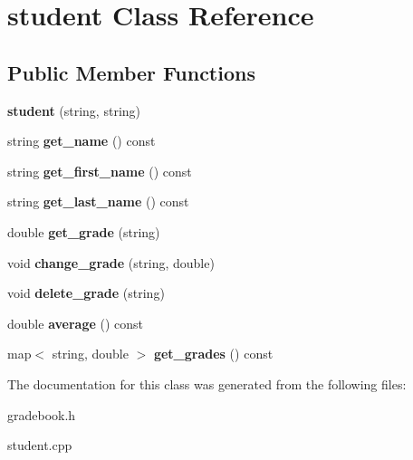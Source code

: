 \hypertarget{classstudent}{}\section{student Class Reference}
\label{classstudent}
\subsection*{Public Member Functions}
\begin{DoxyCompactItemize}
\item 
{\bfseries student} (string, string)\hypertarget{classstudent_ab0157490a34b0bfb685832aa8ac39dfa}{}\label{classstudent_ab0157490a34b0bfb685832aa8ac39dfa}

\item 
string {\bfseries get\+\_\+name} () const \hypertarget{classstudent_a5cdb29c7ac585a1b6f3862d91e4a0373}{}\label{classstudent_a5cdb29c7ac585a1b6f3862d91e4a0373}

\item 
string {\bfseries get\+\_\+first\+\_\+name} () const \hypertarget{classstudent_afc058a05fd8b16d9804d47310c7e7c62}{}\label{classstudent_afc058a05fd8b16d9804d47310c7e7c62}

\item 
string {\bfseries get\+\_\+last\+\_\+name} () const \hypertarget{classstudent_a87aa0cf551b65ed14caf3c7eb2f44387}{}\label{classstudent_a87aa0cf551b65ed14caf3c7eb2f44387}

\item 
double {\bfseries get\+\_\+grade} (string)\hypertarget{classstudent_a1fefbeb70855037595715384b514fb09}{}\label{classstudent_a1fefbeb70855037595715384b514fb09}

\item 
void {\bfseries change\+\_\+grade} (string, double)\hypertarget{classstudent_a73e4be236ee57b5d0369ef80b11a79c3}{}\label{classstudent_a73e4be236ee57b5d0369ef80b11a79c3}

\item 
void {\bfseries delete\+\_\+grade} (string)\hypertarget{classstudent_a2b9c29486ce447ddf8e63b73dd6bfb67}{}\label{classstudent_a2b9c29486ce447ddf8e63b73dd6bfb67}

\item 
double {\bfseries average} () const \hypertarget{classstudent_a04d4264e30fe5581cef0b1c4bc7ee7fc}{}\label{classstudent_a04d4264e30fe5581cef0b1c4bc7ee7fc}

\item 
map$<$ string, double $>$ {\bfseries get\+\_\+grades} () const \hypertarget{classstudent_a04c517e03fc3bd3eee2aedcff1d24e2a}{}\label{classstudent_a04c517e03fc3bd3eee2aedcff1d24e2a}

\end{DoxyCompactItemize}


The documentation for this class was generated from the following files\+:\begin{DoxyCompactItemize}
\item 
gradebook.\+h\item 
student.\+cpp\end{DoxyCompactItemize}

